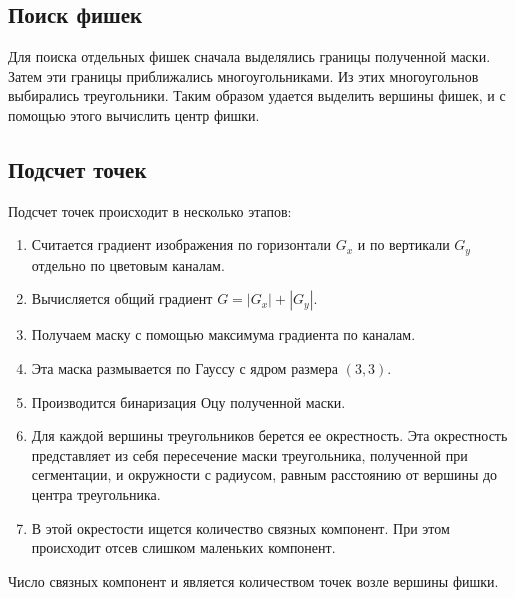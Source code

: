\documentclass[11pt]{extarticle}
\begin{document}
\subsection{Поиск фишек}
Для поиска отдельных фишек сначала выделялись границы полученной маски. Затем эти границы приближались многоугольниками. Из этих многоугольнов выбирались треугольники. Таким образом удается выделить вершины фишек, и с помощью этого вычислить центр фишки.

\subsection{Подсчет точек}
Подсчет точек происходит в несколько этапов:
\begin{enumerate}
  \item Считается градиент изображения по горизонтали $G_x$ и по вертикали $G_y$ отдельно по цветовым каналам.
  \item Вычисляется общий градиент $G = |G_x| + |G_y|$.
  \item Получаем маску с помощью максимума градиента по каналам.
  \item Эта маска размывается по Гауссу с ядром размера $(3, 3)$.
  \item Производится бинаризация Оцу полученной маски.
  \item Для каждой вершины треугольников берется ее окрестность. Эта окрестность представляет из себя пересечение маски треугольника, полученной при сегментации, и окружности с радиусом, равным расстоянию от вершины до центра треугольника.
  \item В этой окрестости ищется количество связных компонент. При этом происходит отсев слишком маленьких компонент.
\end{enumerate}
Число связных компонент и является количеством точек возле вершины фишки.
\end{document}
